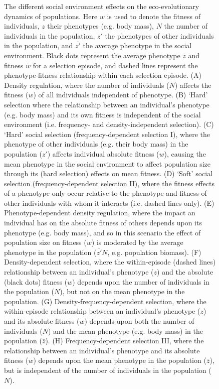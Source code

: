 \documentclass{article}
\begin{document}
\begin{figure} [H]
		\caption{The different social environment effects on the eco-evolutionary dynamics of populations. Here $w$ is used to denote the fitness of individuals, $z$ their phenotypes (e.g. body mass), $N$ the number of individuals in the population, $z'$ the phenotypes of other individuals in the population, and $\bar{z'}$ the average phenotype in the social environment. Black dots represent the average phenotype $\bar{z}$ and fitness $\bar{w}$ for a selection episode, and dashed lines represent the phenotype-fitness relationship within each selection episode. (A) Density regulation, where the number of individuals ($N$) affects the fitness ($w$) of all individuals independent of phenotype. (B) `Hard' selection where the relationship between an individual's phenotype (e.g. body mass) and its own fitness is independent of the social environment (i.e. frequency- and density-independent selection). (C) `Hard' social selection (frequency-dependent selection I), where the phenotype of other individuals (e.g. their body mass) in the population ($z'$) affects individual absolute fitness ($w$), causing the mean phenotype in the social environment to affect population size through its (hard selection) effects on mean fitness. (D) `Soft' social selection (frequency-dependent selection II), where the fitness effects of a phenotype only occur relative to the phenotype and fitness of other individuals with whom it interacts (i.e. dashed lines only). (E) Phenotype-dependent density regulation, where the impact an individual has on the absolute fitness of others depends upon its phenotype (e.g. body mass), and so in this scenario the effect of population size on fitness ($w$) is moderated by the average phenotype in the population ($\bar{z'}N$, e.g. population biomass). (F) Density-dependent selection, where the within-episode (dashed lines) relationship between an individual's phenotype ($z$) and the absolute (black dots) fitness ($w$) depends upon the number of individuals in the population ($N$), but not on the mean phenotype in the population. (G) Density-frequency-dependent selection, where the within-episode relationship between an individual's phenotype ($z$) and its absolute fitness ($w$) depends upon both the number of individuals ($N$) and the mean phenotype (e.g. body mass) in the population ($\bar{z}$). (H) Frequency-dependent selection III, where the relationship between an individual's phenotype and its absolute fitness ($w$) depends upon the mean phenotype in the population ($\bar{z}$), but is independent of the number of individuals in the population ($N$).} \label{fig:selection}
	\end{figure}
	
\end{document}
